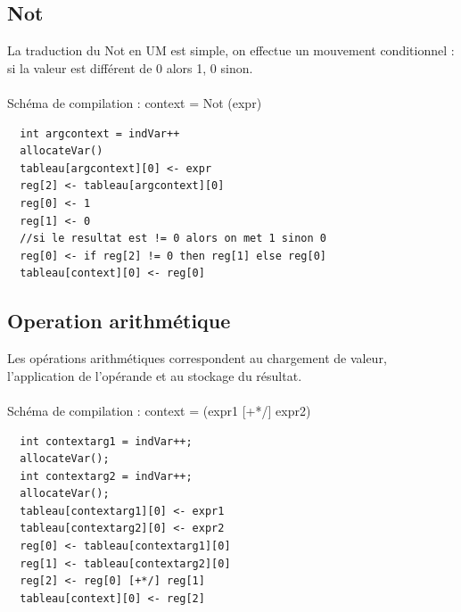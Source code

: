 \documentclass[a4paper,12pt]{report}
\begin{document}
\subsection{Not}
La traduction du Not en UM est simple, on effectue un mouvement conditionnel : si la valeur est différent de 0 alors 1, 0 sinon.
\\ \\
Schéma de compilation : context = Not (expr)
\begin{verbatim}
  int argcontext = indVar++
  allocateVar()
  tableau[argcontext][0] <- expr
  reg[2] <- tableau[argcontext][0]
  reg[0] <- 1
  reg[1] <- 0
  //si le resultat est != 0 alors on met 1 sinon 0
  reg[0] <- if reg[2] != 0 then reg[1] else reg[0]
  tableau[context][0] <- reg[0]
\end{verbatim}

\subsection{Operation arithmétique}
Les opérations arithmétiques correspondent au chargement de valeur, l'application de l'opérande et au stockage du résultat.
\\ \\
Schéma de compilation : context = (expr1 [+*/] expr2)
\begin{verbatim}
  int contextarg1 = indVar++;
  allocateVar();
  int contextarg2 = indVar++;
  allocateVar();
  tableau[contextarg1][0] <- expr1
  tableau[contextarg2][0] <- expr2
  reg[0] <- tableau[contextarg1][0]
  reg[1] <- tableau[contextarg2][0]
  reg[2] <- reg[0] [+*/] reg[1]
  tableau[context][0] <- reg[2]
\end{verbatim}
\end{document}
